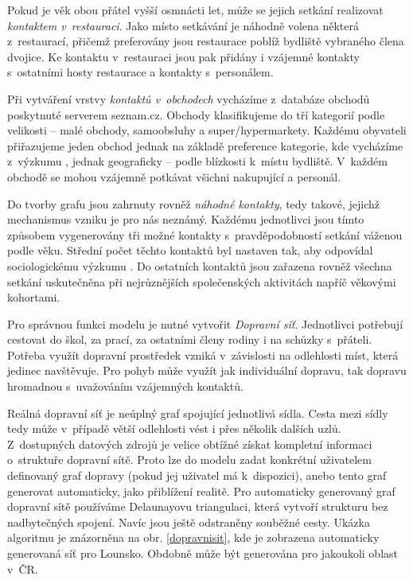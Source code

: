 Pokud je věk obou přátel vyšší osmnácti let, může se jejich setkání realizovat \emph{kontaktem v~restauraci}. Jako místo setkávání je náhodně volena některá z~restaurací, přičemž preferovány jsou restaurace poblíž bydliště vybraného člena dvojice. Ke kontaktu v~restauraci jsou pak přidány i vzájemné kontakty s~ostatními hosty restaurace a kontakty s~personálem.


Při vytváření vrstvy \emph{kontaktů v~obchodech} vycházíme z~databáze obchodů poskytnuté serverem seznam.cz. Obchody klasifikujeme do tří kategorií podle velikosti -- malé obchody, samoobsluhy a super/hypermarkety. Každému obyvateli přiřazujeme jeden obchod jednak na základě preference kategorie, kde vycházíme z~výzkumu \cite{zaj:medianlife}, jednak geograficky -- podle blízkosti k~místu bydliště. V~každém obchodě se mohou vzájemně potkávat všichni nakupující a personál.

Do tvorby grafu jsou zahrnuty rovněž \emph{náhodné kontakty}, tedy takové, jejichž mechanismus vzniku je pro nás neznámý. Každému jednotlivci jsou tímto způsobem vygenerovány tři možné kontakty s~pravděpodobností setkání váženou podle věku. Střední počet těchto kontaktů byl nastaven tak, aby odpovídal sociologickému výz\-ku\-mu \cite{Prem_etal2017}. Do ostatních kontaktů jsou zařazena rovněž všechna setkání uskutečněna při nejrůznějších společenských aktivitách napříč věkovými kohortami.

Pro správnou funkci modelu je nutné vytvořit \emph{Dopravní síť}. Jednotlivci potřebují cestovat do škol, za prací, za ostatními členy rodiny i na schůzky s~přáteli. Potřeba využít dopravní prostředek vzniká v~závislosti na odlehlosti míst, která jedinec navštěvuje. Pro pohyb může využít jak individuální dopravu, tak dopravu hromadnou s~uvažováním vzájemných kontaktů. 

Reálná dopravní síť je neúplný graf spojující jednotlivá sídla. Cesta mezi sídly tedy může v~případě větší odlehlosti vést i přes několik dalších uzlů. Z~dostupných datových zdrojů je velice obtížné získat kompletní informaci o~struktuře dopravní sítě. Proto lze do modelu zadat konkrétní uživatelem definovaný graf dopravy (pokud jej uživatel má k~dispozici), anebo tento graf generovat automaticky, jako přiblížení realitě. Pro automaticky generovaný graf dopravní sítě používáme Delaunayovu triangulaci, která vytvoří strukturu bez nadbytečných spojení. Navíc jsou ještě odstraněny souběžné cesty. Ukázka algoritmu je znázorněna na
obr. \ref{dopravnisit}, kde je zobrazena automaticky generovaná síť pro Lounsko. Obdobně může být generována pro jakoukoli oblast v~ČR. 


